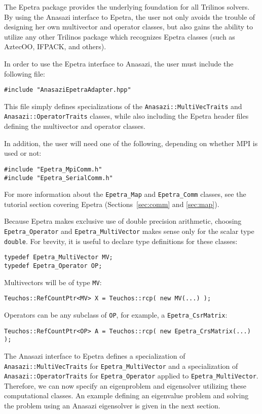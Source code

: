 The Epetra package provides the underlying foundation for all Trilinos solvers.
By using the Anasazi interface to Epetra, the user not only avoids the trouble
of designing her own multivector and operator classes, but also gains the
ability to utilize any other Trilinos package which recognizes Epetra classes
(such as AztecOO, IFPACK, and others).

In order to use the Epetra interface to Anasazi, the user must include
the following file:
\begin{verbatim}
#include "AnasaziEpetraAdapter.hpp"
\end{verbatim}
This file simply defines specializations of the \verb!Anasazi::MultiVecTraits!
and \verb!Anasazi::OperatorTraits! classes, while also including the Epetra
header files defining the multivector and operator classes.

In addition, the user will need one of the following, depending on
whether MPI is used or not:
\begin{verbatim}
#include "Epetra_MpiComm.h"
#include "Epetra_SerialComm.h"
\end{verbatim}
For more information about the \verb!Epetra_Map! and \verb!Epetra_Comm!
classes, see the tutorial section covering Epetra (Sections~\ref{sec:comm} and
\ref{sec:map}).

Because Epetra makes exclusive use of double precision arithmetic, choosing
\verb!Epetra_Operator! and \verb!Epetra_MultiVector! makes sense only for the
scalar type \verb!double!. For brevity, it is useful to declare type definitions
for these classes:
\begin{verbatim}
typedef Epetra_MultiVector MV;
typedef Epetra_Operator OP;
\end{verbatim}

Multivectors will be of type \verb!MV!:
\begin{verbatim}
Teuchos::RefCountPtr<MV> X = Teuchos::rcp( new MV(...) );
\end{verbatim}

Operators can be any subclass of \verb!OP!, for example, a \verb!Epetra_CsrMatrix!:
\begin{verbatim}
Teuchos::RefCountPtr<OP> A = Teuchos::rcp( new Epetra_CrsMatrix(...)  );
\end{verbatim}

The Anasazi interface to Epetra defines a specialization of
\verb!Anasazi::MultiVecTraits! for \verb!Epetra_MultiVector! and a
specialization of \verb!Anasazi::OperatorTraits! for \verb!Epetra_Operator!
applied to \verb!Epetra_MultiVector!. Therefore, we can now specify an
eigenproblem and eigensolver utilizing these computational classes. An example
defining an eigenvalue problem and solving the problem using an Anasazi
eigensolver is given in the next section.

